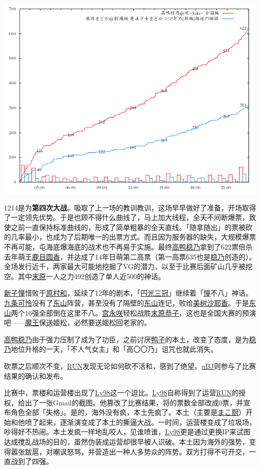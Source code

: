 \includegraphics[width=.5\textwidth]{images/graph1214c.png}

1214是为\textbf{第四次大战}。吸取了上一场的教训教训，这场早早做好了准备，开场取得了一定领先优势。于是也顾不得什么曲线了，马上加大线程，全天不间断爆票，致使之前一直保持标准曲线的，形成了简单粗暴的全天直线。「随拿随出」的票被砍的几率最小，也成为了后期唯一的出票方式。而且因为服务器的缺失，大规模爆票不再可能，屯海底爆海底的战术也不再易于实施。最终\uline{高鸭稳乃}拿到了622票倍杀去年萌王\uline{鹿目圆香}，并达成了14年日萌第二高票（第一高票635也是\uline{稳乃}创造的）。全场发行近千，两家最大可能地挖掘了VG的潜力，以至于比赛后面矿山几乎被挖空。其中\uline{末原}一人之力492创造了单人近500的神话。

\uline{新子憧}惜败于\uline{原村和}，延续了12年的剧本，「\uline{円光三冠}」继续着「\uline{憧}不八」神话。\uline{九条可怜}没有了\uline{东山}阵营，甚至没有了隔壁的\uline{东山}连记，败给\uline{美树沙耶香}。于是\uline{东山}两个16强全部倒在这里不八。\uline{宫永咲}轻松战胜\uline{末原恭子}，这也是全国大赛的预演吧——\uline{魔王}保送{姬松}，必然要送姬松回老家的。

\uline{高鸭稳乃}由于强力压制了成为了功臣，之前讨厌\uline{鸭子}的本土，改变了态度，是为\uline{稳乃}地位升格的一天，「不人气女主」和「高〇〇乃」诅咒也就此消失。

砍票之后顺次不变，\uline{RUN}发现无论如何砍不活和，感到了绝望。\uline{uBJ}则参与了比赛结果的确认和发布。

比赛中，票楼和运营楼出现了\uline{Ly98}这一个逗比。\uline{Ly98}自称得到了运营\uline{RUN}的授权，给出了一张Gmail的截图。他篡改了比赛结果，将的票数全部改成0票，并宣布角色全部「失格」。是的，海外没有疯，本土先疯了。本土（主要是\uline{まこ厨}）开始和他喷了起来，逐渐演变成了本土的撕逼大战。一时间，运营楼变成了垃圾场，吵得好不热闹。本土发疯一样地乱咬人，见谁喷谁，\uline{Ly98}更是通过更换IP来试图达成搅乱战场的目的，虽然伪装成运营却很早被人识破。本土因为海外的强势，变得嚣张跋扈，对嘲讽怒骂，并营造出一种人多势众的阵势。双方打得不可开交，一直战到了四强。

